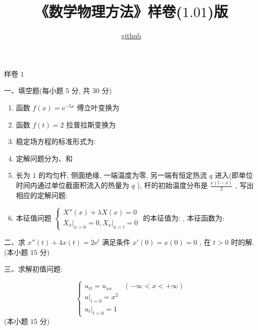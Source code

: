 \documentclass{article}
\title{《数学物理方法》样卷($1.01$)版}
\author{\href{https://github.com/sikouhjw/jxust-Learning-database}{github}}
\theoremstyle{nonumberplain}
\newcommand{\ee}{\mathrm{e}}
\begin{document}
	\maketitle
	\begin{center}
		 样卷 $1$
	\end{center}
	\begin{flushleft}
		一、填空题(每小题 $5$ 分, 共 $30$ 分)
	\end{flushleft}
	\begin{enumerate}
		\item 函数 $f(x)=\ee^{-5x}$ 傅立叶变换为\underline{\hspace{8pc}}
		
		\item 函数 $f(t)=2$ 拉普拉斯变换为\underline{\hspace{8pc}}
		
		\item 稳定场方程的标准形式为: \underline{\hspace{8pc}}
		
		\item 定解问题分为\underline{\hspace{8pc}}、\underline{\hspace{8pc}}和\underline{\hspace{8pc}}
		
		\item 长为 $1$ 的均匀杆, 侧面绝缘, 一端温度为零, 另一端有恒定热流 $q$ 进入(即单位时间内通过单位截面积流入的热量为 $q$ ), 杆的初始温度分布是 $\frac{x(l-x)}{2}$ , 写出相应的定解问题: \underline{\hspace{8pc}}
		
		\item 本征值问题 $\begin{cases}
		X''(x)+\lambda X(x)=0\\
		\left. X_{x} \right|_{x=0}=0,\left. X_{x} \right|_{x=l}=0
		\end{cases}$ 的本征值为: \underline{\hspace{6pc}}, 本征函数为: \underline{\hspace{6pc}}
	\end{enumerate}

    \begin{flushleft}
    	二、求 $x''(t)+4x(t)=2\ee^t$ 满足条件 $x'(0)=x(0)=0$ , 在 $t>0$ 时的解. (本小题 $15$ 分)
    \end{flushleft}

    \begin{flushleft}
    	三、求解初值问题:
    \end{flushleft}
    \begin{equation*}
    	\begin{cases}
    	u_{tt}=u_{xx} & (-\infty<x<+\infty)\\
    	u|_{t=0}=x^2\\
    	u_{t}|_{t=0}=1
    	\end{cases}
    \end{equation*}
    (本小题 $15$ 分)
    
\end{document}
